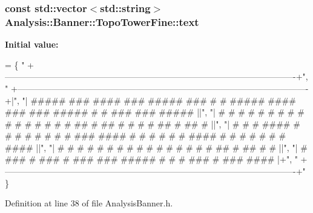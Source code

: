 \subsubsection[{\texorpdfstring{text}{text}}]{\setlength{\rightskip}{0pt plus 5cm}const std\+::vector$<$std\+::string$>$ Analysis\+::\+Banner\+::\+Topo\+Tower\+Fine\+::text\hspace{0.3cm}{\ttfamily [static]}}\hypertarget{namespaceAnalysis_1_1Banner_1_1TopoTowerFine_a5429950d1207be6f4f8d7d0eaa62be34}{}\label{namespaceAnalysis_1_1Banner_1_1TopoTowerFine_a5429950d1207be6f4f8d7d0eaa62be34}
{\bfseries Initial value\+:}
\begin{DoxyCode}
= \{ \textcolor{stringliteral}{"
       +-------------------------------------------------------------------------------------------------------+"},
                             \textcolor{stringliteral}{"
      +-------------------------------------------------------------------------------------------------------+|"},
                             \textcolor{stringliteral}{"| #####  ###  ####   ###  #####  ###  #   # ##### ####     ###     ###  #####
       #   #  ###     ###  ##### ||"},
                             \textcolor{stringliteral}{"|   #   #   # #   # #   #   #   #   # #   # #     #   #   #  ##   #  ## #    
        # #  #  ##   #  ## #     ||"},
                             \textcolor{stringliteral}{"|   #   #   # ####  #   #   #   #   # # # # ###   ####    # # #   # # # #### 
         #   # # #   # # # ####  ||"},
                             \textcolor{stringliteral}{"|   #   #   # #     #   #   #   #   # # # # #     #  %
        # #  ##  #   ##  #     # ||"},
                             \textcolor{stringliteral}{"|   #    ###  #      ###    #    ###   ###  ##### #   %
       #   #  ###  #  ###  ####  |+"},
                             \textcolor{stringliteral}{"
      +-------------------------------------------------------------------------------------------------------+"} \}
\end{DoxyCode}


Definition at line 38 of file Analysis\+Banner.\+h.

